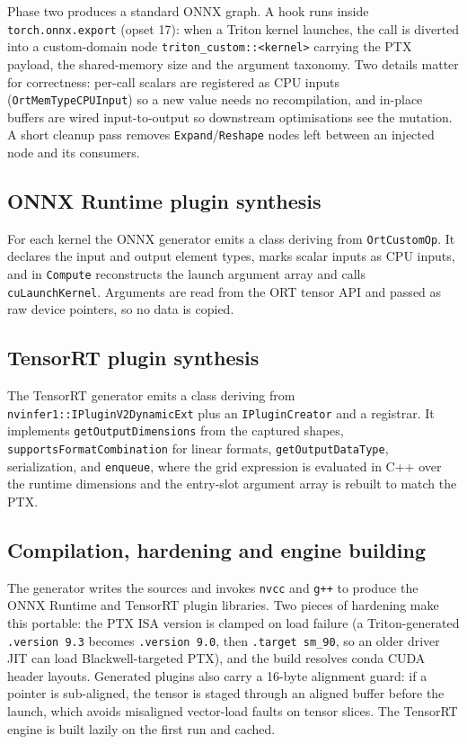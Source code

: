 \documentclass[11pt,a4paper]{article}
\begin{document}
Phase two produces a standard ONNX graph. A hook runs inside
\texttt{torch.onnx.export} (opset 17): when a Triton kernel launches, the call is
diverted into a custom-domain node \texttt{triton\_custom::<kernel>} carrying the
PTX payload, the shared-memory size and the argument taxonomy. Two details matter
for correctness: per-call scalars are registered as CPU inputs
(\texttt{OrtMemTypeCPUInput}) so a new value needs no recompilation, and
in-place buffers are wired input-to-output so downstream optimisations see the
mutation. A short cleanup pass removes \texttt{Expand}/\texttt{Reshape} nodes
left between an injected node and its consumers.

\subsection{ONNX Runtime plugin synthesis}

For each kernel the ONNX generator emits a class deriving from
\texttt{OrtCustomOp}. It declares the input and output element types, marks
scalar inputs as CPU inputs, and in \texttt{Compute} reconstructs the launch
argument array and calls \texttt{cuLaunchKernel}. Arguments are read from the ORT
tensor API and passed as raw device pointers, so no data is copied.

\subsection{TensorRT plugin synthesis}

The TensorRT generator emits a class deriving from
\texttt{nvinfer1::IPluginV2DynamicExt} plus an \texttt{IPluginCreator} and a
registrar. It implements \texttt{getOutputDimensions} from the captured shapes,
\texttt{supportsFormatCombination} for linear formats,
\texttt{getOutputDataType}, serialization, and \texttt{enqueue}, where the grid
expression is evaluated in C++ over the runtime dimensions and the entry-slot
argument array is rebuilt to match the PTX.

\subsection{Compilation, hardening and engine building}

The generator writes the sources and invokes \texttt{nvcc} and \texttt{g++} to
produce the ONNX Runtime and TensorRT plugin libraries. Two pieces of hardening
make this portable: the PTX ISA version is clamped on load failure (a
Triton-generated \texttt{.version 9.3} becomes \texttt{.version 9.0}, then
\texttt{.target sm\_90}, so an older driver JIT can load Blackwell-targeted
PTX), and the build resolves conda CUDA header layouts. Generated plugins also
carry a 16-byte alignment guard: if a pointer is sub-aligned, the tensor is
staged through an aligned buffer before the launch, which avoids misaligned
vector-load faults on tensor slices. The TensorRT engine is built lazily on the
first run and cached.
\end{document}
